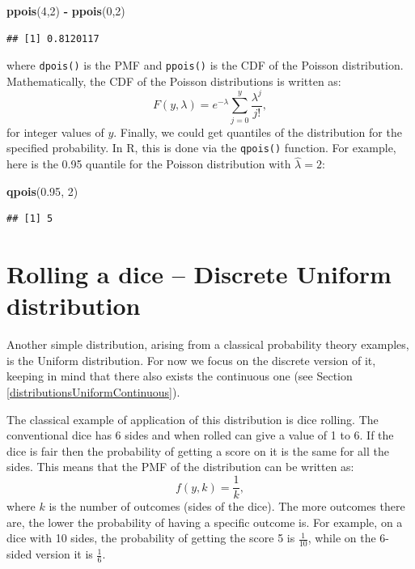 \documentclass[
]{book}
\newenvironment{Shaded}{\begin{snugshade}}{\end{snugshade}}
\newcommand{\DecValTok}[1]{\textcolor[rgb]{0.00,0.00,0.81}{#1}}
\newcommand{\FloatTok}[1]{\textcolor[rgb]{0.00,0.00,0.81}{#1}}
\newcommand{\KeywordTok}[1]{\textcolor[rgb]{0.13,0.29,0.53}{\textbf{#1}}}
\newcommand{\NormalTok}[1]{#1}
\newcommand{\OperatorTok}[1]{\textcolor[rgb]{0.81,0.36,0.00}{\textbf{#1}}}
\newcommand{\StringTok}[1]{\textcolor[rgb]{0.31,0.60,0.02}{#1}}
\theoremstyle{definition}
\theoremstyle{definition}
\theoremstyle{definition}
\theoremstyle{definition}
\theoremstyle{remark}
\begin{document}
\begin{Shaded}
\begin{Highlighting}[]
\KeywordTok{ppois}\NormalTok{(}\DecValTok{4}\NormalTok{,}\DecValTok{2}\NormalTok{) }\OperatorTok{{-}}\StringTok{ }\KeywordTok{ppois}\NormalTok{(}\DecValTok{0}\NormalTok{,}\DecValTok{2}\NormalTok{)}
\end{Highlighting}
\end{Shaded}

\begin{verbatim}
## [1] 0.8120117
\end{verbatim}

where \texttt{dpois()} is the PMF and \texttt{ppois()} is the CDF of the Poisson distribution. Mathematically, the CDF of the Poisson distributions is written as:
\begin{equation}
    F(y, \lambda) = e^{-\lambda} \sum_{j=0}^{y} \frac{\lambda^j }{j!} ,
    \label{eq:PoissonCDF}
\end{equation}
for integer values of \(y\). Finally, we could get quantiles of the distribution for the specified probability. In R, this is done via the \texttt{qpois()} function. For example, here is the 0.95 quantile for the Poisson distribution with \(\hat{\lambda}=2\):

\begin{Shaded}
\begin{Highlighting}[]
\KeywordTok{qpois}\NormalTok{(}\FloatTok{0.95}\NormalTok{, }\DecValTok{2}\NormalTok{)}
\end{Highlighting}
\end{Shaded}

\begin{verbatim}
## [1] 5
\end{verbatim}

\hypertarget{distributionUniform}{%
\section{Rolling a dice -- Discrete Uniform distribution}\label{distributionUniform}}

Another simple distribution, arising from a classical probability theory examples, is the Uniform distribution. For now we focus on the discrete version of it, keeping in mind that there also exists the continuous one (see Section \ref{distributionsUniformContinuous}).

The classical example of application of this distribution is dice rolling. The conventional dice has 6 sides and when rolled can give a value of 1 to 6. If the dice is fair then the probability of getting a score on it is the same for all the sides. This means that the PMF of the distribution can be written as:
\begin{equation}
    f(y, k) = \frac{1}{k},
    \label{eq:UniformPMF}
\end{equation}
where \(k\) is the number of outcomes (sides of the dice). The more outcomes there are, the lower the probability of having a specific outcome is. For example, on a dice with 10 sides, the probability of getting the score 5 is \(\frac{1}{10}\), while on the 6-sided version it is \(\frac{1}{6}\).
\end{document}
